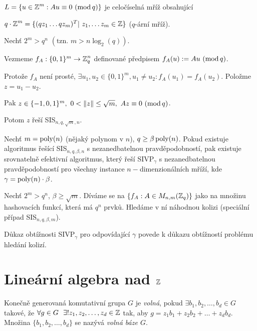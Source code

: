 \begin{note}
$L = \{u \in \operatorname{\mathbb{Z}}^m: Au \equiv 0\ (\operatorname{mod} q)\}$ je celočíselná mříž obsahující

$q\cdot\Z^m = \{ (qz_1 \dots qz_m)^T | \ z_1,\dots z_m \in \Z\}$ ($q$-ární mříž).
\end{note}

\begin{example}
Nechť $2^m > q^n$ $(\text{tzn. } m > n\log_2 (q))$. 

Vezmeme $f_A: \{0,1\}^m \rightarrow \operatorname{\mathbb{Z}}^n_q$ definované předpisem $f_A(u):=Au\ (\operatorname{mod} q)$.

Protože $f_A$ není prosté, $\exists u_1, u_2 \in \{0,1\}^m, u_1 \neq u_2: f_A(u_1) = f_A(u_2)$. Položme $z = u_1 - u_2$.

Pak $z\in\{-1,0,1\}^m, \ 0<\|z\|\leq\sqrt{m},\ Az\equiv0\ (\modulo q)$.

Potom $z$ řeší SIS$_{n,q,\sqrt{m},n}$.
\end{example}

\begin{theorem}[M. Ajatai, 1996]
Nechť $m=\operatorname{poly}(n)$ (nějaký polynom v $n$), $q\geq\beta\operatorname{poly}(n)$. Pokud existuje algoritmus řešící SIS$_{n,q,\beta,n}$ s nezanedbatelnou pravděpodobností, pak existuje srovnatelně efektivní algoritmus, který řeší SIVP$_\gamma$ s nezanedbatelnou pravděpodobností pro všechny instance $n-$dimenzionálních mříží, kde $\gamma=\operatorname{poly}(n)\cdot\beta$.
\end{theorem}

\begin{example}
Nechť $2^m>q^n$, $\beta\geq\sqrt{m}$.
Díváme se na $\{f_A: A \in M_{n,m}(\operatorname{\mathbb{Z}}_q)\}$ jako na množinu hashovacích funkcí, která má $q^n$ prvků. Hledáme v ní náhodnou kolizi (speciální případ SIS$_{n,q, \beta,m}$).

Důkaz obtížnosti SIVP$_\gamma$ pro odpovídající $\gamma$ povede k důkazu obtížností problému hledání kolizí.
\end{example}

\section{\texorpdfstring{Lineární algebra nad $\operatorname{\mathbb{Z}}$}{Linearni algebra na Z}}
\begin{definition}
Konečně generovaná komutativní grupa $G$ je \emph{volná}, pokud $\exists b_1, b_2, \dots, b_d \in G$ takové, že $\forall g \in G\ \ \exists ! z_1, z_2, \dots, z_d \in \operatorname{\mathbb{Z}}$ tak, aby $g = z_1 b_1 +  z_2b_2 + \dots + z_d b_d$. Množina $\{b_1,b_2, \dots, b_d\}$ se nazývá \emph{volná báze $G$}.
\end{definition}

